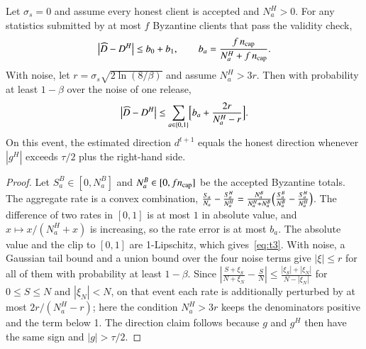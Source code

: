 \begin{theorem}\label{thm:stats}
Let $\sigma_s=0$ and assume every honest client is accepted and $N^H_a>0$. For any statistics submitted by at most $f$ Byzantine clients that pass the validity check,
\begin{equation}\label{eq:t3}
\bigl|\widehat{D}-D^H\bigr|\le b_0+b_1,\qquad b_a=\frac{f\,n_{\mathrm{cap}}}{N^H_a+f\,n_{\mathrm{cap}}}.
\end{equation}
With noise, let $r=\sigma_s\sqrt{2\ln(8/\beta)}$ and assume $N^H_a>3r$. Then with probability at least $1-\beta$ over the noise of one release,
\begin{equation}\label{eq:t3noise}
\bigl|\widehat{D}-D^H\bigr|\le\sum_{a\in\{0,1\}}\Bigl[b_a+\frac{2r}{N^H_a-r}\Bigr].
\end{equation}
On this event, the estimated direction $d^{t+1}$ equals the honest direction whenever $|g^H|$ exceeds $\tau/2$ plus the right-hand side.
\end{theorem}

\begin{proof}
Let $S^B_a\in[0,N^B_a]$ and $N^B_a\in[0,fn_{\mathrm{cap}}]$ be the accepted Byzantine totals. The aggregate rate is a convex combination,
$\frac{S_a}{N_a}-\frac{S^H_a}{N^H_a}=\frac{N^B_a}{N^H_a+N^B_a}\Bigl(\frac{S^B_a}{N^B_a}-\frac{S^H_a}{N^H_a}\Bigr)$.
The difference of two rates in $[0,1]$ is at most $1$ in absolute value, and $x\mapsto x/(N^H_a+x)$ is increasing, so the rate error is at most $b_a$. The absolute value and the clip to $[0,1]$ are 1-Lipschitz, which gives~\eqref{eq:t3}. With noise, a Gaussian tail bound and a union bound over the four noise terms give $|\xi|\le r$ for all of them with probability at least $1-\beta$. Since $|\frac{S+\xi_S}{N+\xi_N}-\frac{S}{N}|\le\frac{|\xi_S|+|\xi_N|}{N-|\xi_N|}$ for $0\le S\le N$ and $|\xi_N|<N$, on that event each rate is additionally perturbed by at most $2r/(N^H_a-r)$; here the condition $N^H_a>3r$ keeps the denominators positive and the term below 1. The direction claim follows because $g$ and $g^H$ then have the same sign and $|g|>\tau/2$.
\end{proof}

